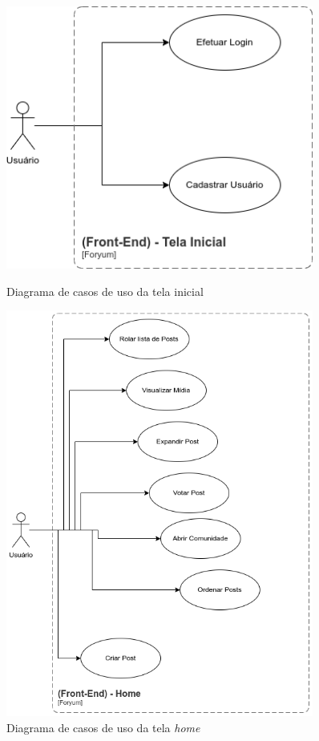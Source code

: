 \documentclass[12pt]{article}
\begin{document}
\begin{figure}
    \centering
    \begin{minipage}{0.45\textwidth}
        \centering
        \includegraphics[width=0.9\textwidth]{diagrams/welcome_diagram.png}
        \caption{Diagrama de casos de uso da tela inicial}\label{fig:welcome_diagram}
    \end{minipage}\hfill
    \begin{minipage}{0.45\textwidth}
        \centering
        \includegraphics[width=0.9\textwidth]{diagrams/home_diagram.png}
        \caption{Diagrama de casos de uso da tela \textit{home}}\label{fig:home_diagram}
    \end{minipage}
\end{figure}
\end{document}
